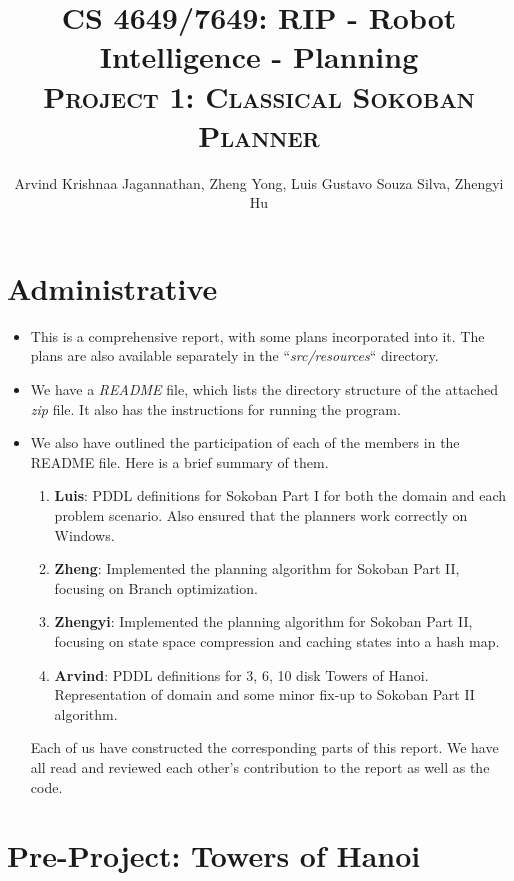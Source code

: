 \documentclass[10pt, letter]{article}
\newcommand{\doctitle}{%
CS 4649/7649: RIP - Robot Intelligence - Planning}
\begin{document}
\title{\textbf{\doctitle} \\\textsc{Project 1: Classical Sokoban Planner}}
  \author {Arvind Krishnaa Jagannathan, Zheng Yong, Luis Gustavo Souza Silva, Zhengyi Hu}%
   \date{}
\maketitle

\section{Administrative}
\begin{itemize}
	\item This is a comprehensive report, with some plans incorporated into it. The plans are also available separately in the ``\textit{src/resources}`` directory.
	\item We have a \textit{README} file, which lists the directory structure of the attached \textit{zip} file. It also has the instructions for running the program.
	\item We also have outlined the participation of each of the members in the README file. Here is a brief summary of them.
		\begin{enumerate}
			\item \textbf{Luis}: PDDL definitions for Sokoban Part I for both the domain and each problem scenario. Also ensured that the planners work correctly on Windows.
			\item \textbf{Zheng}: Implemented the planning algorithm for Sokoban Part II, focusing on Branch optimization.
			\item \textbf{Zhengyi}: Implemented the planning algorithm for Sokoban Part II, focusing on state space compression and caching states into a hash map.
			\item \textbf{Arvind}: PDDL definitions for 3, 6, 10 disk Towers of Hanoi. Representation of domain and some minor fix-up to Sokoban Part II algorithm.
		\end{enumerate}
	Each of us have constructed the corresponding parts of this report. We have all read and reviewed each other's contribution to the report as well as the code.
\end{itemize}

\section{Pre-Project: Towers of Hanoi}
\end{document}
